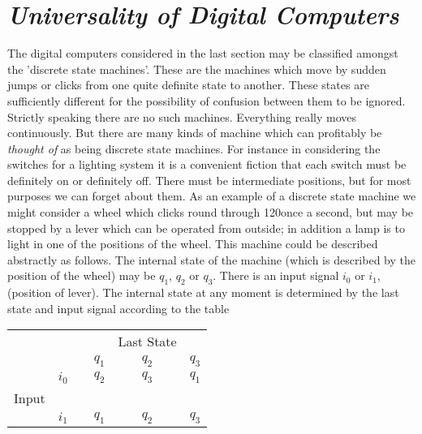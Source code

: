     \section{\textit{Universality of Digital Computers}}
    
    The digital computers considered in the last section may be classified amongst the 'discrete state machines'. These are the machines which move by sudden jumps or clicks from one quite definite state to another. These states are sufficiently different for the possibility of confusion between them to be ignored. Strictly speaking there are no such machines. Everything really moves continuously. But there are many kinds of machine which can profitably be \textit{thought of} as being discrete state machines. For instance in considering the switches for a lighting system it is a convenient fiction that each switch must be definitely on or definitely off. There must be intermediate positions, but for most purposes we can forget about them. As an example of a discrete state machine we might consider a wheel which clicks round through 120\degree once a second, but may be stopped by a lever which can be operated from outside; in addition a lamp is to light in one of the positions of the wheel. This machine could be described abstractly as follows. The internal state of the machine (which is described by the position of the wheel) may be $q_1$, $q_2$ or $q_3$. There is an input signal $i_0$ or $i_1$, (position of lever). The internal state at any moment is determined by the last state and input signal according to the table

    \begin{table}[h!]
        \centering
        \begin{tabular}{cccccc}
              &       &                       &       & Last State &                            \\
              &       &                       & $q_1$ & $q_2$      & $q_3$                      \\ \cline{4-6} 
              & $i_0$ & \multicolumn{1}{c|}{} & $q_2$ & $q_3$      & \multicolumn{1}{c|}{$q_1$} \\
        Input &       & \multicolumn{1}{c|}{} &       &            & \multicolumn{1}{c|}{}      \\
              & $i_1$ & \multicolumn{1}{c|}{} & $q_1$ & $q_2$      & \multicolumn{1}{c|}{$q_3$} \\ \cline{4-6} 
        \end{tabular}
    \end{table}
    
